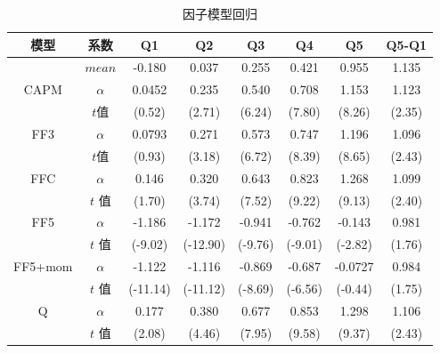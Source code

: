 \begin{table}[htbp]
\caption{因子模型回归}
\label{factor}
\begin{tabular*}{\hsize}{@{\hskip\tabcolsep\extracolsep\fill}*{8}{c}}
\toprule
模型                       & 系数                    & Q1 & Q2 & Q3 & Q4 & Q5 & Q5-Q1 \\ \midrule
 &$ mean$& -0.180&  0.037&0.255&0.421& 0.955&  1.135\\
 \multirow{2}{*}{CAPM}     & $\alpha$ &    0.0452         &    0.235&    0.540&    0.708&    1.153&   1.123\\
                         &$ t$值                     &     (0.52)         &   (2.71)         &   (6.24)         &   (7.80)         &   (8.26)  & (2.35)         \\
\multirow{2}{*}{FF3}     & $\alpha$ &      0.0793         &    0.271&    0.573&    0.747&    1.196&  1.096\\
                         & $t$值                     &    (0.93)         &   (3.18)         &   (6.72)         &   (8.39)         &   (8.65)      &(2.43)     \\
\multirow{2}{*}{FFC}     & $\alpha$  &  0.146  &    0.320&    0.643&    0.823&    1.268 & 1.099\\
                         &$ t$ 值                   &    (1.70)         &   (3.74)         &   (7.52)         &   (9.22)         &   (9.13)    &(2.40)       \\
\multirow{2}{*}{FF5}     &$\alpha$  & -1.186&   -1.172&   -0.941&   -0.762&   -0.143      & 0.981\\
                         & $t$  值                   &   (-9.02)         & (-12.90)         &  (-9.76)         &  (-9.01)         &  (-2.82)   &   (1.76)      \\
\multirow{2}{*}{FF5+mom} &$\alpha$  & -1.122&   -1.116&   -0.869&   -0.687&  -0.0727  &  0.984    \\
                         &$ t $ 值        &        (-11.14)         & (-11.12)         &  (-8.69)         &  (-6.56)         &  (-0.44)  & (1.75)  \\
\multirow{2}{*}{Q}       &$\alpha$  &   0.177&    0.380&    0.677&    0.853&    1.298    &1.106\\
                         & $t$   值                  &     (2.08)         &   (4.46)         &   (7.95)         &   (9.58)         &   (9.37)  &(2.43)     \\ \bottomrule
\end{tabular*}
\end{table}

